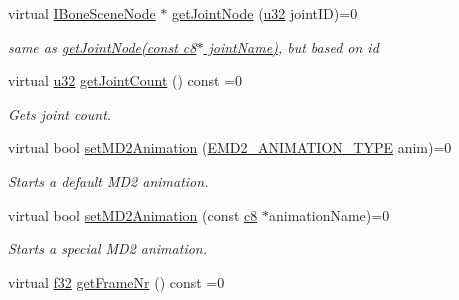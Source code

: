 \begin{DoxyCompactItemize}
\mbox{\label{classirr_1_1scene_1_1IAnimatedMeshSceneNode_a790a1a03ada0eb754504609d76c5fcc1}} 
virtual \hyperlink{classirr_1_1scene_1_1IBoneSceneNode}{I\+Bone\+Scene\+Node} $\ast$ \hyperlink{classirr_1_1scene_1_1IAnimatedMeshSceneNode_a790a1a03ada0eb754504609d76c5fcc1}{get\+Joint\+Node} (\hyperlink{namespaceirr_a0416a53257075833e7002efd0a18e804}{u32} joint\+ID)=0
\begin{DoxyCompactList}\small\item\em same as \hyperlink{classirr_1_1scene_1_1IAnimatedMeshSceneNode_ac7b64a5ddbe5d570dc5276b894a63619}{get\+Joint\+Node(const c8$\ast$ joint\+Name)}, but based on id \end{DoxyCompactList}\item 
virtual \hyperlink{namespaceirr_a0416a53257075833e7002efd0a18e804}{u32} \hyperlink{classirr_1_1scene_1_1IAnimatedMeshSceneNode_a146657063c055fcb951ca6fd66171589}{get\+Joint\+Count} () const =0
\begin{DoxyCompactList}\small\item\em Gets joint count. \end{DoxyCompactList}\item 
virtual bool \hyperlink{classirr_1_1scene_1_1IAnimatedMeshSceneNode_aca2ca2593857c60aac61c0fd78365d2d}{set\+M\+D2\+Animation} (\hyperlink{namespaceirr_1_1scene_a08d4a84966e1d2886d0d57e4acbb4f19}{E\+M\+D2\+\_\+\+A\+N\+I\+M\+A\+T\+I\+O\+N\+\_\+\+T\+Y\+PE} anim)=0
\begin{DoxyCompactList}\small\item\em Starts a default M\+D2 animation. \end{DoxyCompactList}\item 
virtual bool \hyperlink{classirr_1_1scene_1_1IAnimatedMeshSceneNode_a8732866332327a7d43b91f41b5549fe3}{set\+M\+D2\+Animation} (const \hyperlink{namespaceirr_a9395eaea339bcb546b319e9c96bf7410}{c8} $\ast$animation\+Name)=0
\begin{DoxyCompactList}\small\item\em Starts a special M\+D2 animation. \end{DoxyCompactList}\item 
\mbox{\label{classirr_1_1scene_1_1IAnimatedMeshSceneNode_abba274efec0cc98900518a86a150e09e}} 
virtual \hyperlink{namespaceirr_a0277be98d67dc26ff93b1a6a1d086b07}{f32} \hyperlink{classirr_1_1scene_1_1IAnimatedMeshSceneNode_abba274efec0cc98900518a86a150e09e}{get\+Frame\+Nr} () const =0

\end{DoxyCompactItemize}
